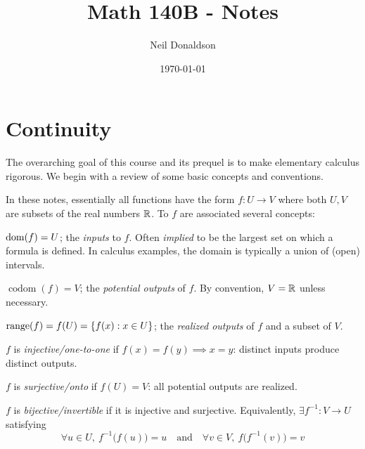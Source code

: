 \graphicspath{{1contrev/asy/}}

\title{Math 140B - Notes}
\author{Neil Donaldson}
\date{\today}
\maketitle

\thispagestyle{empty}

\section{Continuity}

The overarching goal of this course and its prequel is to make elementary calculus rigorous. We begin with a review of some basic concepts and conventions.



In these notes, essentially all functions have the form $f:U\to V$ where both $U,V$ are subsets of the real numbers $\mathbb{R}$. To $f$ are associated several concepts:
\begin{description}\itemsep2pt
	\item[\normalfont\emph{Domain}] $\operatorname{dom}(f)=U$; the \emph{inputs} to $f$. Often \emph{implied} to be the largest set on which a formula is defined. In calculus examples, the domain is typically a union of (open) intervals.
	\item[\normalfont\emph{Codomain}] $\operatorname{codom}(f)=V$; the \emph{potential outputs} of $f$. By convention, $V=\mathbb{R}$ unless necessary.
	\item[\normalfont\emph{Range}] $\operatorname{range}(f)=f(U)=\{f(x):x\in U\}$; the \emph{realized outputs} of $f$ and a subset of $V$.
	\item[\normalfont\emph{Injectivity}] $f$ is \emph{injective/one-to-one} if $f(x)=f(y)\implies x=y$: distinct inputs produce distinct outputs.
	\item[\normalfont\emph{Surjectivity}] $f$ is \emph{surjective/onto} if $f(U)=V$: all potential outputs are realized.
	\item[\normalfont\emph{Inverses}] $f$ is \emph{bijective/invertible} if it is injective and surjective. Equivalently, $\exists f^{-1}:V\to U$ satisfying
	\[
		\forall u\in U,\ f^{-1}\bigl(f(u)\bigr)=u\quad\text{and}\quad \forall v\in V,\ f\bigl(f^{-1}(v)\bigr)=v
	\]
\end{description}

